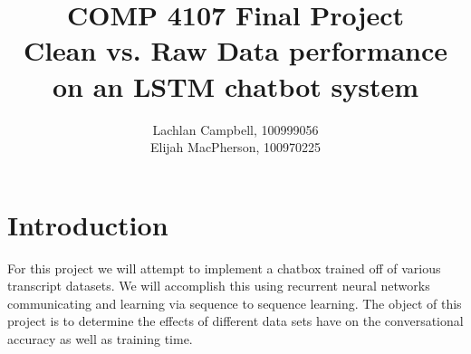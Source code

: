 \documentclass[titlepage]{article}
\newcommand\tab[1][1cm]{\hspace*{#1}}
\begin{document}
\title{COMP 4107 Final Project\\
         {\small Clean vs. Raw Data performance on an LSTM chatbot system}}
\author{Lachlan Campbell, 100999056\\
              Elijah MacPherson, 100970225}
\maketitle

\section{Introduction}
\tab For this project we will attempt to implement a chatbox trained off of various transcript datasets. We will accomplish this using recurrent neural networks communicating and learning via sequence to sequence learning. The object of this project is to determine the effects of different data sets have on the conversational accuracy as well as training time.
\end{document}
